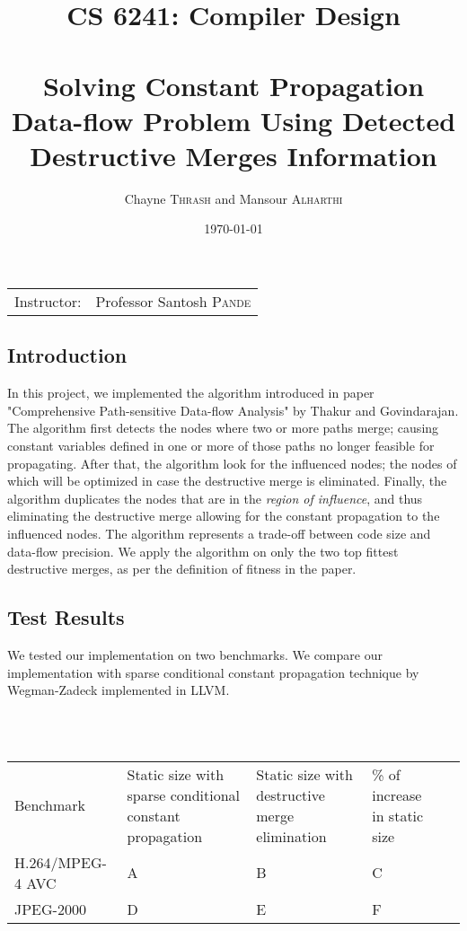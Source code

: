 \documentclass{article}
\title{CS 6241: Compiler Design \\~\\ Solving Constant Propagation Data-flow Problem Using Detected Destructive Merges Information} %
\author{Chayne \textsc{Thrash} and Mansour \textsc{Alharthi}} %
\date{\today} %
\begin{document}
\maketitle %

\begin{center}
\begin{tabular}{l r}
Instructor: & Professor Santosh \textsc{Pande} %
\end{tabular}
\end{center}

\subsection{Introduction}
In this project, we implemented the algorithm introduced in paper "Comprehensive Path-sensitive Data-flow Analysis" by Thakur and Govindarajan. The algorithm first detects the nodes where two or more paths merge; causing constant variables defined in one or more of those paths no longer feasible for propagating. After that, the algorithm look for the influenced nodes; the nodes of which will be optimized in case the destructive merge is eliminated. Finally, the algorithm duplicates the nodes that are in the \textit{region of influence}, and thus eliminating the destructive merge allowing for the constant propagation to the influenced nodes. The algorithm represents a trade-off between code size and data-flow precision. We apply the algorithm on only the two top fittest destructive merges, as per the definition of fitness in the paper. 

\subsection{Test Results}
We tested our implementation on two benchmarks. We compare our implementation with sparse conditional constant propagation technique by Wegman-Zadeck implemented in LLVM. 

~\\~

\begin{adjustbox}{center}
\renewcommand{\arraystretch}{2}
\begin{tabular}{| C{3cm} | C{3cm} | C{3cm} | C{3cm} | C{3cm} |}
\hline
Benchmark & Static size with sparse conditional constant propagation & Static size with destructive merge elimination & \% of increase in static size \\  
H.264/MPEG-4 AVC & A & B & C  \\ 
JPEG-2000 & D & E & F  \\ 
\end{tabular}
\end{adjustbox}
\end{document}
